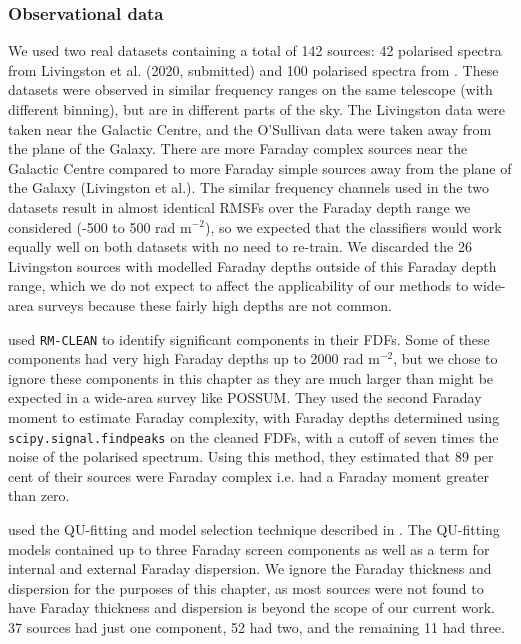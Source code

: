   \subsubsection{Observational data}
  \label{sec:faraday-observational-data}

    We used two real datasets containing a total of 142 sources: 42 polarised spectra from Livingston et al. (2020, submitted) and 100 polarised spectra from \citet{osullivan_broad-band_2017}. These datasets were observed in similar frequency ranges on the same telescope (with different binning), but are in different parts of the sky. The Livingston data were taken near the Galactic Centre, and the O'Sullivan data were taken away from the plane of the Galaxy. There are more Faraday complex sources near the Galactic Centre compared to more Faraday simple sources away from the plane of the Galaxy (Livingston et al.). The similar frequency channels used in the two datasets result in almost identical RMSFs over the Faraday depth range we considered (-500 to 500 rad m$^{-2}$), so we expected that the classifiers would work equally well on both datasets with no need to re-train. We discarded the 26 Livingston sources with modelled Faraday depths outside of this Faraday depth range, which we do not expect to affect the applicability of our methods to wide-area surveys because these fairly high depths are not common.

    \citet{livingston21faraday} used \texttt{RM-CLEAN} \citep{heald09faraday} to identify significant components in their FDFs. Some of these components had very high Faraday depths up to 2000 rad m$^{-2}$, but we chose to ignore these components in this chapter as they are much larger than might be expected in a wide-area survey like POSSUM. They used the second Faraday moment \citep{brown11report} to estimate Faraday complexity, with Faraday depths determined using \texttt{scipy.signal.find\textunderscore{}peaks} on the cleaned FDFs, with a cutoff of seven times the noise of the polarised spectrum. Using this method, they estimated that 89 per cent of their sources were Faraday complex i.e. had a Faraday moment greater than zero.

    \citet{osullivan_broad-band_2017} used the QU-fitting and model selection technique described in \citet{osullivan12agn}. The QU-fitting models contained up to three Faraday screen components as well as a term for internal and external Faraday dispersion. We ignore the Faraday thickness and dispersion for the purposes of this chapter, as most sources were not found to have Faraday thickness and dispersion is beyond the scope of our current work. 37 sources had just one component, 52 had two, and the remaining 11 had three.

